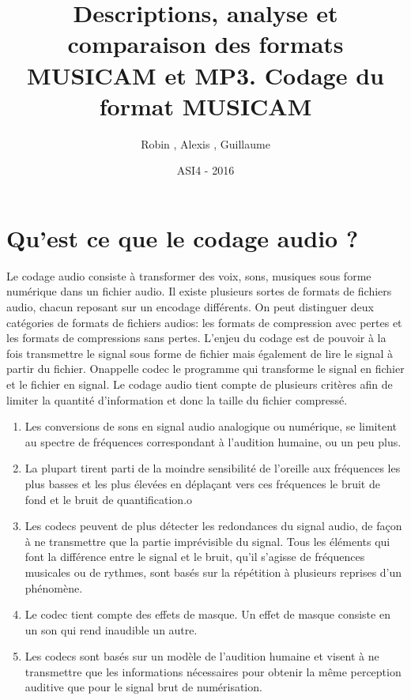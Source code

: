 \documentclass[a4paper,10pt, french]{article}
\title{Descriptions, analyse et comparaison des formats MUSICAM et MP3. Codage du format MUSICAM }
\author{Robin \bsc{Condat}, Alexis \bsc{Durieux}, Guillaume \bsc{Boulier}}
\date{ASI4 - 2016}
\begin{document}
\maketitle

\section{Qu'est ce que le codage audio ?}
  Le codage audio consiste à transformer des voix, sons, musiques sous forme numérique dans un fichier audio. Il existe plusieurs sortes de formats de fichiers audio, chacun reposant sur un encodage différents. On peut distinguer deux catégories de formats de fichiers audios: les formats de compression avec pertes et les formats de compressions sans pertes. L'enjeu du codage est de pouvoir à la fois transmettre le signal sous forme de fichier mais également de lire le signal à partir du fichier. Onappelle codec le programme qui transforme le signal en fichier et le fichier en signal.
  Le codage audio tient compte de plusieurs critères afin de limiter la quantité d'information et donc la taille du fichier compressé.
  \begin{enumerate}
    \item Les conversions de sons en signal audio analogique ou numérique, se limitent au spectre de fréquences correspondant à l'audition humaine, ou un peu plus.
    \item La plupart tirent parti de la moindre sensibilité de l'oreille aux fréquences les plus basses et les plus élevées en déplaçant vers ces fréquences le bruit de fond et le bruit de quantification.o
    \item Les codecs peuvent de plus détecter les redondances du signal audio, de façon à ne transmettre que la partie imprévisible du signal. Tous les éléments qui font la différence entre le signal et le bruit, qu'il s'agisse de fréquences musicales ou de rythmes, sont basés sur la répétition à plusieurs reprises d'un phénomène.
    \item Le codec tient compte des effets de masque. Un effet de masque consiste en un son qui rend inaudible un autre.
    \item Les codecs sont basés sur un modèle de l'audition humaine et visent à ne transmettre que les informations nécessaires pour obtenir la même perception auditive que pour le signal brut de numérisation.
  \end{enumerate}
\end{document}
